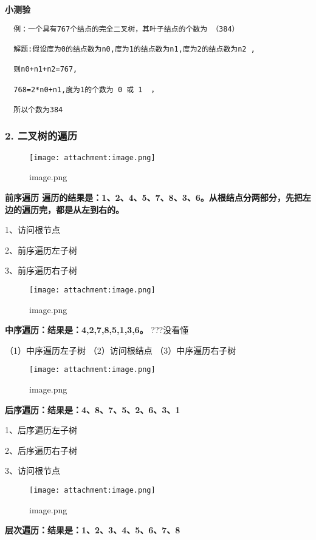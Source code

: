 \documentclass[11pt]{article}
\makeatletter
\def\maxwidth{\ifdim\Gin@nat@width>\linewidth\linewidth
    \else\Gin@nat@width\fi}
\let\Oldincludegraphics\includegraphics
\renewcommand{\includegraphics}[1]{\Oldincludegraphics[width=.8\maxwidth]{#1}}
\makeatother
\begin{document}
    \textbf{小测验}

\begin{verbatim}
  例：一个具有767个结点的完全二叉树，其叶子结点的个数为 （384）

  解题:假设度为0的结点数为n0,度为1的结点数为n1,度为2的结点数为n2 ,

  则n0+n1+n2=767,

  768=2*n0+n1,度为1的个数为 0 或 1  ，

  所以个数为384
\end{verbatim}

    \subsubsection{2.
二叉树的遍历}\label{ux4e8cux53c9ux6811ux7684ux904dux5386}

    \begin{figure}
\centering
\texttt{[image: attachment:image.png]}
\caption{image.png}
\end{figure}

    \textbf{前序遍历
遍历的结果是：1、2、4、5、7、8、3、6。从根结点分两部分，先把左边的遍历完，都是从左到右的。}

1、访问根节点

2、前序遍历左子树

3、前序遍历右子树

\begin{figure}
\centering
\texttt{[image: attachment:image.png]}
\caption{image.png}
\end{figure}

    \textbf{中序遍历：结果是：4,2,7,8,5,1,3,6。} ???没看懂

（1）中序遍历左子树 （2）访问根结点 （3）中序遍历右子树

\begin{figure}
\centering
\texttt{[image: attachment:image.png]}
\caption{image.png}
\end{figure}

    \textbf{后序遍历：结果是：4、8、7、5、2、6、3、1}

1、后序遍历左子树

2、后序遍历右子树

3、访问根节点

\begin{figure}
\centering
\texttt{[image: attachment:image.png]}
\caption{image.png}
\end{figure}

    \textbf{层次遍历：结果是：1、2、3、4、5、6、7、8}
\end{document}
